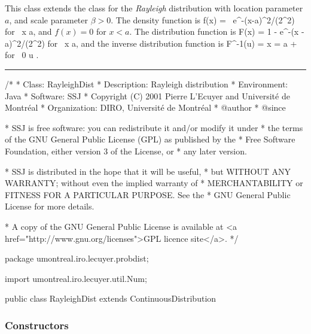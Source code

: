 
This class extends the class  for
the {\em Rayleigh\/} distribution \cite{tEVA00a} with
 location parameter $a$, and scale parameter $\beta > 0$.
The density function is
\eq
  f(x) = \, 
                e^{-(x-a)^2/(2\beta^2)}
 \qquad\mbox{for } x \ge a, 
\endeq
and $f(x) = 0$ for $x < a$.
The distribution function is
\eq
   F(x) = 1 - e^{-(x - a)^2/(2\beta^2)}
 \qquad\mbox{for } x \ge a,               
\endeq
and the inverse distribution function is
\eq
     F^{-1}(u) = x = a + \beta{}
               \qquad \mbox{for } 0 \le u .     
\endeq

\bigskip\hrule

\begin{code}
\begin{hide}
/*
 * Class:        RayleighDist
 * Description:  Rayleigh distribution
 * Environment:  Java
 * Software:     SSJ 
 * Copyright (C) 2001  Pierre L'Ecuyer and Université de Montréal
 * Organization: DIRO, Université de Montréal
 * @author       
 * @since

 * SSJ is free software: you can redistribute it and/or modify it under
 * the terms of the GNU General Public License (GPL) as published by the
 * Free Software Foundation, either version 3 of the License, or
 * any later version.

 * SSJ is distributed in the hope that it will be useful,
 * but WITHOUT ANY WARRANTY; without even the implied warranty of
 * MERCHANTABILITY or FITNESS FOR A PARTICULAR PURPOSE.  See the
 * GNU General Public License for more details.

 * A copy of the GNU General Public License is available at
   <a href="http://www.gnu.org/licenses">GPL licence site</a>.
 */
\end{hide}
package umontreal.iro.lecuyer.probdist;
\begin{hide}
import umontreal.iro.lecuyer.util.Num;
\end{hide}
public class RayleighDist extends ContinuousDistribution\begin{hide} {
   private double a;
   private double beta;


\end{hide}
\end{code}
\subsubsection* {Constructors}

